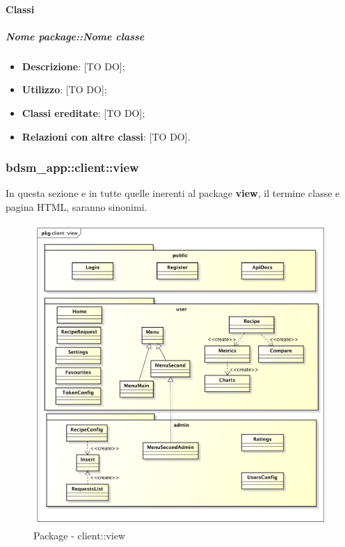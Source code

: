 		\paragraph{Classi} %
			\subparagraph{Nome package::Nome classe} %
			\label{subp:subparagraph_name}
				\begin{itemize}
					\item \textbf{Descrizione}: [TO DO];
					\item \textbf{Utilizzo}: [TO DO];
					\item \textbf{Classi ereditate}: [TO DO];
					\item \textbf{Relazioni con altre classi}: [TO DO].
				\end{itemize}	






	\pagebreak

	\subsubsection{bdsm\_app::client::view} %
	\label{ssub:bdsm_app_client_view}
	In questa sezione e in tutte quelle inerenti al package \textbf{view}, il termine classe e pagina HTML, saranno sinonimi.
	\begin{figure}[htbp]
		\centering
		\centerline{\includegraphics[scale=0.45]{./images/client_view.pdf}}
		\caption{Package - client::view}
	\end{figure}


